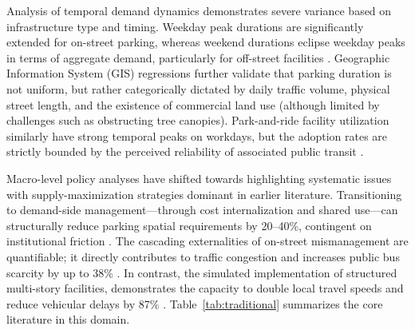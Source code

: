 \documentclass[conference]{IEEEtran}
\begin{document}
Analysis of temporal demand dynamics demonstrates severe variance based on infrastructure type and timing. Weekday peak durations are significantly extended for on-street parking, whereas weekend durations eclipse weekday peaks in terms of aggregate demand, particularly for off-street facilities \cite{b25}. Geographic Information System (GIS) regressions further validate that parking duration is not uniform, but rather categorically dictated by daily traffic volume, physical street length, and the existence of commercial land use (although limited by challenges such as obstructing tree canopies)\cite{b8}. Park-and-ride facility utilization similarly have strong temporal peaks on workdays, but the adoption rates are strictly bounded by the perceived reliability of associated public transit \cite{b37}.

Macro-level policy analyses have shifted towards highlighting systematic issues with supply-maximization strategies dominant in earlier literature. Transitioning to demand-side management—through cost internalization and shared use—can structurally reduce parking spatial requirements by 20–40\%, contingent on institutional friction \cite{b15}. The cascading externalities of on-street mismanagement are quantifiable; it directly contributes to traffic congestion and increases public bus scarcity by up to 38\% \cite{b17}. In contrast, the simulated implementation of structured multi-story facilities, demonstrates the capacity to double local travel speeds and reduce vehicular delays by 87\% \cite{b36}. Table~\ref{tab:traditional} summarizes the core literature in this domain.
\end{document}
